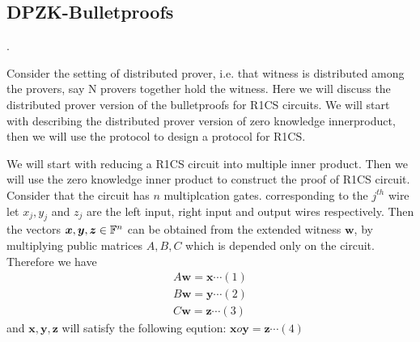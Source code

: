 \subsection{DPZK-Bulletproofs}
.
\begin{comment}
We will give two constructions of distributed proof generation for R1CS with zero knowledge property. In the first construction we will start with reducing the proof for single prover R1CS to single prover zero knowledge inner product argument, then we will give a transformation for zero knwoledge inner product argument from single prover to multiple provers, which will directly imply the proof generation system for multiprover R1CS. In the second construction we will  
\end{comment}
Consider the setting of distributed prover, i.e. that witness is distributed among the provers, say N provers together hold the witness. Here we will discuss the distributed prover version of the bulletproofs for R1CS circuits. We will start with describing the distributed prover version of zero knowledge innerproduct, then we will use the protocol to design a protocol for R1CS.

We will start with reducing a R1CS circuit into multiple inner product. Then we will use the zero knowledge inner product to construct the proof of R1CS circuit. Consider that the circuit has $n$ multiplcation gates. corresponding to the $j^{th}$ wire let $x_j, y_j$ and $z_j$ are the left input, right input and output wires respectively. Then the vectors $\bm{x}, \bm{y}, \bm{z}\in {\mathbb F}^n$ can be obtained from the extended witness $\bm{w}$, by multiplying public matrices $A, B, C$ which is depended only on the circuit. Therefore we have 
\begin{align*}
A\bm{w}=\bm{x} \cdots (1)\\
B\bm{w}=\bm{y} \cdots (2)\\
C\bm{w}=\bm{z} \cdots (3)
\end{align*}
and $\bm{x}, \bm{y}, \bm{z}$ will satisfy the following eqution: $\bm{x} o \bm{y} =\bm{z} \cdots (4)$ 

